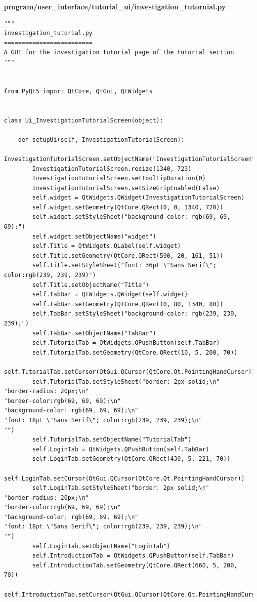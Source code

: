 \documentclass{article}
\begin{document}
\textbf{program/user\_interface/tutorial\_ui/investigation\_tutoruial.py}
\begin{lstlisting}
"""
investigation_tutorial.py
=========================
A GUI for the investigation tutorial page of the tutorial section
"""


from PyQt5 import QtCore, QtGui, QtWidgets


class Ui_InvestigationTutorialScreen(object):

    def setupUi(self, InvestigationTutorialScreen):
        InvestigationTutorialScreen.setObjectName("InvestigationTutorialScreen")
        InvestigationTutorialScreen.resize(1340, 723)
        InvestigationTutorialScreen.setToolTipDuration(0)
        InvestigationTutorialScreen.setSizeGripEnabled(False)
        self.widget = QtWidgets.QWidget(InvestigationTutorialScreen)
        self.widget.setGeometry(QtCore.QRect(0, 0, 1340, 720))
        self.widget.setStyleSheet("background-color: rgb(69, 69, 69);")
        self.widget.setObjectName("widget")
        self.Title = QtWidgets.QLabel(self.widget)
        self.Title.setGeometry(QtCore.QRect(590, 20, 161, 51))
        self.Title.setStyleSheet("font: 36pt \"Sans Serif\"; color:rgb(239, 239, 239)")
        self.Title.setObjectName("Title")
        self.TabBar = QtWidgets.QWidget(self.widget)
        self.TabBar.setGeometry(QtCore.QRect(0, 80, 1340, 80))
        self.TabBar.setStyleSheet("background-color: rgb(239, 239, 239);")
        self.TabBar.setObjectName("TabBar")
        self.TutorialTab = QtWidgets.QPushButton(self.TabBar)
        self.TutorialTab.setGeometry(QtCore.QRect(10, 5, 200, 70))
        self.TutorialTab.setCursor(QtGui.QCursor(QtCore.Qt.PointingHandCursor))
        self.TutorialTab.setStyleSheet("border: 2px solid;\n"
"border-radius: 20px;\n"
"border-color:rgb(69, 69, 69);\n"
"background-color: rgb(69, 69, 69);\n"
"font: 18pt \"Sans Serif\"; color:rgb(239, 239, 239);\n"
"")
        self.TutorialTab.setObjectName("TutorialTab")
        self.LoginTab = QtWidgets.QPushButton(self.TabBar)
        self.LoginTab.setGeometry(QtCore.QRect(430, 5, 221, 70))
        self.LoginTab.setCursor(QtGui.QCursor(QtCore.Qt.PointingHandCursor))
        self.LoginTab.setStyleSheet("border: 2px solid;\n"
"border-radius: 20px;\n"
"border-color:rgb(69, 69, 69);\n"
"background-color: rgb(69, 69, 69);\n"
"font: 18pt \"Sans Serif\"; color:rgb(239, 239, 239);\n"
"")
        self.LoginTab.setObjectName("LoginTab")
        self.IntroductionTab = QtWidgets.QPushButton(self.TabBar)
        self.IntroductionTab.setGeometry(QtCore.QRect(660, 5, 200, 70))
        self.IntroductionTab.setCursor(QtGui.QCursor(QtCore.Qt.PointingHandCursor))

\end{lstlisting}
\end{document}
